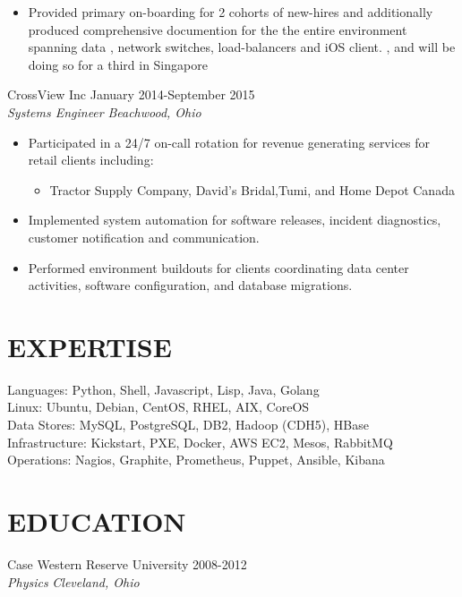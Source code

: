 \documentclass[line,margin]{res}
\begin{document}
\begin{resume}
\begin{itemize}
\item Provided primary on-boarding for 2 cohorts of new-hires and additionally produced comprehensive documention for the the entire environment spanning data , network switches, load-balancers and iOS client.  , and will be doing so for a third in Singapore
\end{itemize}

\large CrossView Inc \hfill  \large January 2014-September 2015 \\
\normalsize
{\sl Systems Engineer} \hfill  {\sl Beachwood, Ohio}

\begin{itemize} 
\item Participated in a 24/7 on-call rotation for revenue generating services for retail clients including:
  \begin{itemize}   
  \item Tractor Supply Company, David's Bridal,Tumi, and Home Depot Canada
  \end{itemize}
\item Implemented system automation for software releases, incident diagnostics, customer notification and communication.
\item Performed environment buildouts for clients coordinating data center activities, software configuration, and database migrations.
\end{itemize}

\section{EXPERTISE}
 Languages: \normalsize \hfill
Python, Shell, Javascript, Lisp, Java, Golang\\
 Linux: \normalsize \hfill
Ubuntu, Debian, CentOS, RHEL, AIX, CoreOS \\ 
Data Stores: \normalsize \hfill
MySQL, PostgreSQL, DB2, Hadoop (CDH5), HBase \\
 Infrastructure: \normalsize \hfill
Kickstart, PXE, Docker, AWS EC2, Mesos, RabbitMQ \\
 Operations: \normalsize \hfill
Nagios, Graphite, Prometheus, Puppet, Ansible, Kibana
\section{EDUCATION}

\large Case Western Reserve University   \hfill 2008-2012 \\ \normalsize {\sl Physics} \hfill {\sl Cleveland, Ohio}


\end{resume}
\end{document}
